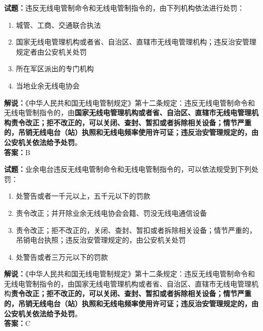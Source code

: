 \documentclass{ctexbook}
\begin{document}
\noindent\textbf{试题：}违反无线电管制命令和无线电管制指令的，由下列机构依法进行处罚：
\begin{enumerate}[leftmargin=3em]

  \item 城管、工商、交通联合执法
  \item 国家无线电管理机构或者省、自治区、直辖市无线电管理机构；违反治安管理规定者由公安机关处罚
  \item 所在军区派出的专门机构
  \item 当地业余无线电协会
\end{enumerate}
\noindent\textbf{解说：}《中华人民共和国无线电管制规定》第十二条规定：违反无线电管制命令和无线电管制指令的，由\textbf{国家无线电管理机构或者省、自治区、直辖市无线电管理机构责令改正；拒不改正的，可以关闭、查封、暂扣或者拆除相关设备；情节严重的，吊销无线电台（站）执照和无线电频率使用许可证；违反治安管理规定的，由公安机关依法给予处罚}。\\\noindent\textbf{答案：}B

\vspace{\baselineskip}

\noindent\textbf{试题：}业余电台违反无线电管制命令和无线电管制指令的，可以依法规受到下列处罚：
\begin{enumerate}[leftmargin=3em]
  \item  处警告或者一千元以上，五千元以下的罚款
  \item  责令改正；并开除业余无线电协会会籍、罚没无线电通信设备
  \item  责令改正；拒不改正的，关闭、查封、暂扣或者拆除相关设备；情节严重的，吊销电台执照；违反治安管理规定的，由公安机关处罚
  \item  处警告或者三万元以下的罚款
\end{enumerate}
\noindent\textbf{解说：}《中华人民共和国无线电管制规定》第十二条规定：违反无线电管制命令和无线电管制指令的，由国家无线电管理机构或者省、自治区、直辖市无线电管理机构\textbf{责令改正；拒不改正的，可以关闭、查封、暂扣或者拆除相关设备；情节严重的，吊销无线电台（站）执照和无线电频率使用许可证；违反治安管理规定的，由公安机关依法给予处罚}。\\\noindent\textbf{答案：}C


\end{document}
